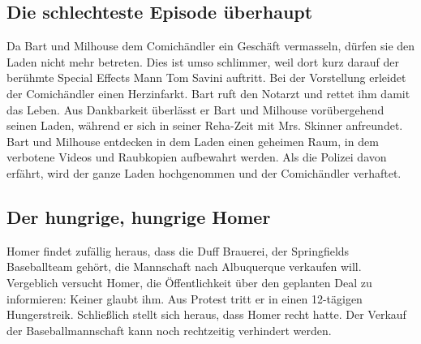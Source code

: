 \subsection{Die schlechteste Episode überhaupt}\label{CABF08}
Da Bart und Milhouse dem Comichändler ein Geschäft vermasseln, dürfen sie den Laden nicht mehr betreten. Dies ist umso schlimmer, weil dort kurz darauf der berühmte Special Effects Mann Tom Savini auftritt. Bei der Vorstellung erleidet der Comichändler einen Herzinfarkt. Bart ruft den Notarzt und rettet ihm damit das Leben. Aus Dankbarkeit überlässt er Bart und Milhouse vorübergehend seinen Laden, während er sich in seiner Reha-Zeit mit Mrs. Skinner anfreundet. Bart und Milhouse entdecken in dem Laden einen geheimen Raum, in dem verbotene Videos und Raubkopien aufbewahrt werden. Als die Polizei davon erfährt, wird der ganze Laden hochgenommen und der Comichändler verhaftet.


\subsection{Der hungrige, hungrige Homer}\label{CABF09}
Homer findet zufällig heraus, dass die Duff Brauerei, der Springfields Baseballteam gehört, die Mannschaft nach Albuquerque verkaufen will. Vergeblich versucht Homer, die Öffentlichkeit über den geplanten Deal zu informieren: Keiner glaubt ihm. Aus Protest tritt er in einen 12-tägigen Hungerstreik. Schließlich stellt sich heraus, dass Homer recht hatte. Der Verkauf der Baseballmannschaft kann noch rechtzeitig verhindert werden.

